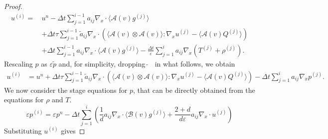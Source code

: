 \documentclass[final,11pt]{siamart251216}
\numberwithin{equation}{section}
\theoremstyle{definition}
\theoremstyle{remark}
\begin{document}
\begin{proof}
\begin{equation}
\begin{split}
u^{(i)} = \, & u^n - \Delta t  \sum_{j = 1}^{i-1} a_{ij} \nabla_x \cdot \langle \mathcal{A}(v) g^{(j)} \rangle \\
& + \Delta t \tau  \sum_{j=1}^{i-1} \tilde{a}_{ij} \nabla_x \cdot \left( \langle \mathcal{A}(v) \otimes \mathcal{A}(v) \rangle : \nabla_x u^{(j)} - \langle \mathcal{A}(v) Q^{(j)} \rangle \right) \\
& + \Delta t  \sum_{j = 1}^{i-1} a_{ij} \nabla_x \cdot \langle \mathcal{A}(v) g^{(j)} \rangle - \frac{\Delta t}{\varepsilon} \sum_{j = 1}^i a_{ij} \nabla_x (T^{(j)} + \rho^{(j)}).
\end{split}
\end{equation}
Rescaling $p$ as  $\varepsilon \tilde p $ and, for simplicity, dropping  $\widetilde{~}$ ~in what follows, we obtain
\begin{equation}
\begin{split} \label{InternalStagesforu}
u^{(i)} &= u^n 
+ \Delta t \tau  \sum_{j=1}^{i-1} \tilde{a}_{ij}  \nabla_x \cdot \left( \langle \mathcal{A}(v) \otimes  \mathcal{A}(v) \rangle : \nabla_x u^{(j)} - \langle \mathcal{A}(v) Q^{(j)} \rangle\right) 
- \Delta t  \sum_{j = 1}^i  a_{ij} \nabla_x p^{(j)}.
\end{split}
\end{equation}
We now consider the stage equations for $p$, that can be directly obtained from the equations for $\rho$ and $T$.
\begin{equation}
\varepsilon p^{(i)} = \varepsilon p^n  - \Delta t  \sum_{j = 1}^i \left( \frac{1}{d} a_{ij} \nabla_x \cdot \langle \mathcal{B}(v) g^{(j)} \rangle  + \frac{2+d}{d \varepsilon} a_{ij} \nabla_x \cdot u^{(j)}\right) 
\end{equation}
Substituting $u^{(i)}$ gives

\end{proof}
\end{document}
